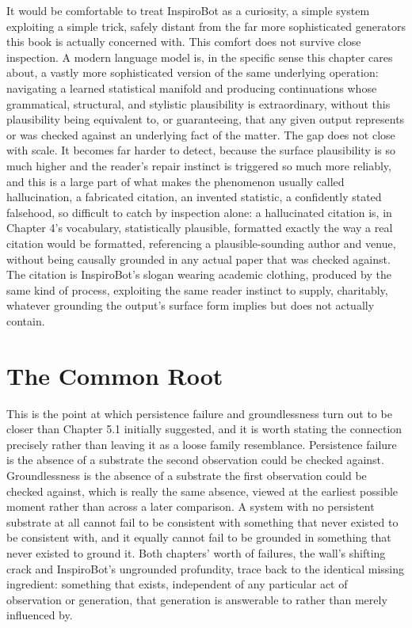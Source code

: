 It would be comfortable to treat InspiroBot as a curiosity, a simple system exploiting a simple trick, safely distant from the far more sophisticated generators this book is actually concerned with. This comfort does not survive close inspection. A modern language model is, in the specific sense this chapter cares about, a vastly more sophisticated version of the same underlying operation: navigating a learned statistical manifold and producing continuations whose grammatical, structural, and stylistic plausibility is extraordinary, without this plausibility being equivalent to, or guaranteeing, that any given output represents or was checked against an underlying fact of the matter. The gap does not close with scale. It becomes far harder to detect, because the surface plausibility is so much higher and the reader's repair instinct is triggered so much more reliably, and this is a large part of what makes the phenomenon usually called hallucination, a fabricated citation, an invented statistic, a confidently stated falsehood, so difficult to catch by inspection alone: a hallucinated citation is, in Chapter 4's vocabulary, statistically plausible, formatted exactly the way a real citation would be formatted, referencing a plausible-sounding author and venue, without being causally grounded in any actual paper that was checked against. The citation is InspiroBot's slogan wearing academic clothing, produced by the same kind of process, exploiting the same reader instinct to supply, charitably, whatever grounding the output's surface form implies but does not actually contain.

\section{The Common Root}

This is the point at which persistence failure and groundlessness turn out to be closer than Chapter 5.1 initially suggested, and it is worth stating the connection precisely rather than leaving it as a loose family resemblance. Persistence failure is the absence of a substrate the second observation could be checked against. Groundlessness is the absence of a substrate the first observation could be checked against, which is really the same absence, viewed at the earliest possible moment rather than across a later comparison. A system with no persistent substrate at all cannot fail to be consistent with something that never existed to be consistent with, and it equally cannot fail to be grounded in something that never existed to ground it. Both chapters' worth of failures, the wall's shifting crack and InspiroBot's ungrounded profundity, trace back to the identical missing ingredient: something that exists, independent of any particular act of observation or generation, that generation is answerable to rather than merely influenced by.

